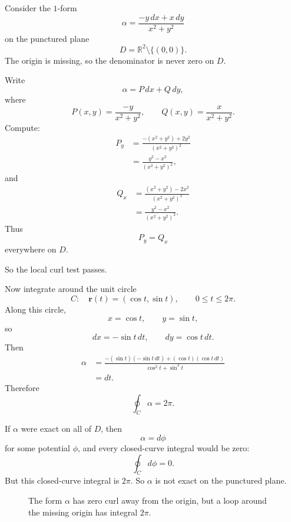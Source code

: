 Consider the \(1\)-form
\[
    \alpha=\frac{-y\,dx+x\,dy}{x^2+y^2}
\]
on the punctured plane
\[
    D=\mathbb R^2\setminus\{(0,0)\}.
\]
The origin is missing, so the denominator is never zero on \(D\).

Write
\[
    \alpha=P\,dx+Q\,dy,
\]
where
\[
    P(x,y)=\frac{-y}{x^2+y^2},
    \qquad
    Q(x,y)=\frac{x}{x^2+y^2}.
\]
Compute:
\[
\begin{aligned}
P_y
&=
\frac{-(x^2+y^2)+2y^2}{(x^2+y^2)^2}\\
&=
\frac{y^2-x^2}{(x^2+y^2)^2},
\end{aligned}
\]
and
\[
\begin{aligned}
Q_x
&=
\frac{(x^2+y^2)-2x^2}{(x^2+y^2)^2}\\
&=
\frac{y^2-x^2}{(x^2+y^2)^2}.
\end{aligned}
\]
Thus
\[
    P_y=Q_x
\]
everywhere on \(D\).

So the local curl test passes.

Now integrate around the unit circle
\[
    C:\quad \mathbf r(t)=(\cos t,\sin t),
    \qquad 0\le t\le2\pi.
\]
Along this circle,
\[
    x=\cos t,\qquad y=\sin t,
\]
so
\[
    dx=-\sin t\,dt,
    \qquad
    dy=\cos t\,dt.
\]
Then
\[
\begin{aligned}
\alpha
&=
\frac{-(\sin t)(-\sin t\,dt)+(\cos t)(\cos t\,dt)}
{\cos^2t+\sin^2t}\\
&=
dt.
\end{aligned}
\]
Therefore
\[
\boxed{
    \oint_C \alpha=2\pi.
}
\]

If \(\alpha\) were exact on all of \(D\), then
\[
    \alpha=d\phi
\]
for some potential \(\phi\), and every closed-curve integral would be zero:
\[
    \oint_C d\phi=0.
\]
But this closed-curve integral is \(2\pi\).  So \(\alpha\) is not exact on the punctured
plane.

\begin{figure}[h]
\centering
{}
\caption{The form \(\alpha\) has zero curl away from the origin, but a loop around the
missing origin has integral \(2\pi\).}
\end{figure}

